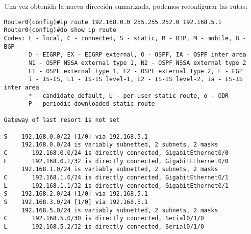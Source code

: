 \documentclass{article}
\begin{document}
Una vez obtenida la nueva direcci\'on sumarizada, podemos reconfigurar las rutas: \\
\begin{verbatim}
Router0(config)#ip route 192.168.0.0 255.255.252.0 192.168.5.1
Router0(config)#do show ip route
Codes: L - local, C - connected, S - static, R - RIP, M - mobile, B - BGP
       D - EIGRP, EX - EIGRP external, O - OSPF, IA - OSPF inter area
       N1 - OSPF NSSA external type 1, N2 - OSPF NSSA external type 2
       E1 - OSPF external type 1, E2 - OSPF external type 2, E - EGP
       i - IS-IS, L1 - IS-IS level-1, L2 - IS-IS level-2, ia - IS-IS inter area
       * - candidate default, U - per-user static route, o - ODR
       P - periodic downloaded static route

Gateway of last resort is not set

S    192.168.0.0/22 [1/0] via 192.168.5.1
     192.168.0.0/24 is variably subnetted, 2 subnets, 2 masks
C       192.168.0.0/24 is directly connected, GigabitEthernet0/0
L       192.168.0.1/32 is directly connected, GigabitEthernet0/0
     192.168.1.0/24 is variably subnetted, 2 subnets, 2 masks
C       192.168.1.0/24 is directly connected, GigabitEthernet0/1
L       192.168.1.1/32 is directly connected, GigabitEthernet0/1
S    192.168.2.0/24 [1/0] via 192.168.5.1
S    192.168.3.0/24 [1/0] via 192.168.5.1
     192.168.5.0/24 is variably subnetted, 2 subnets, 2 masks
C       192.168.5.0/30 is directly connected, Serial0/1/0
L       192.168.5.2/32 is directly connected, Serial0/1/0

\end{verbatim}
\end{document}
